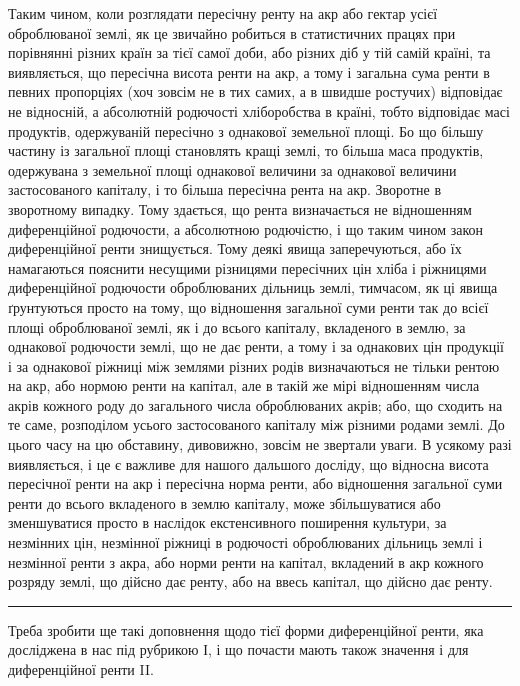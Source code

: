 Таким чином, коли розглядати пересічну ренту на акр або гектар усієї
оброблюваної землі, як це звичайно робиться в статистичних працях при порівнянні
різних країн за тієї самої доби, або різних діб у тій самій країні, та
виявляється, що пересічна висота ренти на акр, а тому і загальна сума ренти
в певних пропорціях (хоч зовсім не в тих самих, а в швидше ростучих) відповідає
не відносній, а абсолютній родючості хліборобства в країні, тобто відповідає
масі продуктів, одержуваній пересічно з однакової земельної площі. Бо що
більшу частину із загальної площі становлять кращі землі, то більша маса
продуктів, одержувана з земельної площі однакової величини за однакової величини
застосованого капіталу, і то більша пересічна рента на акр. Зворотне в зворотному
випадку. Тому здається, що рента визначається не відношенням диференційної
родючости, а абсолютною родючістю, і що таким чином закон диференційної
ренти знищується. Тому деякі явища заперечуються, або їх намагаються
пояснити несущими різницями пересічних цін хліба і ріжницями диференційної
родючости оброблюваних дільниць землі, тимчасом, як ці явища ґрунтуються
просто на тому, що відношення загальної суми ренти так до всієї площі оброблюваної
землі, як і до всього капіталу, вкладеного в землю, за однакової родючости
землі, що не дає ренти, а тому і за однакових цін продукції і за
однакової ріжниці між землями різних родів визначаються не тільки рентою
на акр, або нормою ренти на капітал, але в такій же мірі відношенням числа
акрів кожного роду до загального числа оброблюваних акрів; або, що сходить
на те саме, розподілом усього застосованого капіталу між різними родами землі.
До цього часу на цю обставину, дивовижно, зовсім не звертали уваги. В усякому
разі виявляється, і це є важливе для нашого дальшого досліду, що відносна
висота пересічної ренти на акр і пересічна норма ренти, або відношення
загальної суми ренти до всього вкладеного в землю капіталу, може збільшуватися
або зменшуватися просто в наслідок екстенсивного поширення культури,
за незмінних цін, незмінної ріжниці в родючості оброблюваних дільниць землі
і незмінної ренти з акра, або норми ренти на капітал, вкладений в акр
кожного розряду землі, що дійсно дає ренту, або на ввесь капітал, що дійсно
дає ренту.

\pfbreak

Треба зробити ще такі доповнення щодо тієї форми диференційної ренти,
яка досліджена в нас під рубрикою І, і що почасти мають також значення і
для диференційної ренти II.

